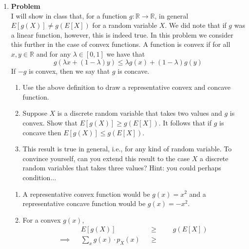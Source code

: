 \documentclass[12pt]{article}
\newenvironment{Ex}{\textbf{Problem}\vspace{.75em}\\}{}
\begin{document}
\begin{enumerate}
\begin{Ex}
\begin{solution}
\begin{enumerate}
\begin{equation}
\begin{aligned}
            \end{aligned}
          \end{equation}
        \end{enumerate}
      \end{solution}
    \end{Ex}
  \item
    \begin{Ex}
      I will show in class that, for a function $g : \mathbb{R}
      \rightarrow \mathbb{R}$, in general $E[g(X)] \not= g(E[X])$ for
      a random variable $X$. We did note that if $g$ was a linear
      function, however, this is indeed true. In this problem we
      consider this further in the case of convex functions. A
      function is convex if for all $x, y \in \mathbb{R}$ and for any
      $\lambda \in [0, 1]$ we have that
      \begin{equation}
        \label{eq:convex-prob}
        g(\lambda x + (1-\lambda)y) \le \lambda g(x) + (1-\lambda)g(y)
      \end{equation}
      If $-g$ is convex, then we say that $g$ is concave.
      \begin{enumerate}
      \item Use the above definition to draw a representative convex
        and concave function.
      \item Suppose $X$ is a discrete random variable that takes two
        values and $g$ is convex. Show that $E[g(X)] \ge g(E[X])$. It
        follows that if $g$ is concave then $E[g(X)] \le g(E[X])$.
      \item This result is true in general, i.e., for any kind of
        random variable. To convince yourself, can you extend this
        result to the case $X$ a discrete random variables that takes
        three values? Hint: you could perhaps condition...
      \end{enumerate}
      \begin{solution} \hfill
        \begin{enumerate}
        \item A representative convex function would be $g(x) = x^2$
          and a representative concave function would be $g(x) = -x^2$.
        \item For a convex $g(x)$,
          \begin{equation}
            \label{eq:7b-pre-sol}
            \begin{aligned}
              && E[g(X)] &&\ge&&& g(E[X]) \\
              \implies && \sum_x g(x) \cdot p_X(x) &&\ge&&&

\end{aligned}
\end{equation}
\end{enumerate}
\end{solution}
\end{Ex}
\end{enumerate}
\end{document}
